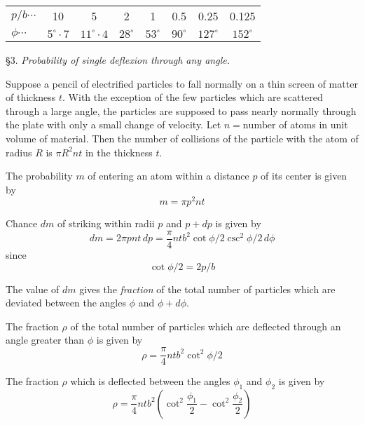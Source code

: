\documentclass{article}
\begin{document}
\begin{center}
\begin{tabular}{lccccccc}
$p/b\cdots$ & 10 & 5 & 2 & 1 & 0.5 & 0.25 & 0.125
\\
$\phi\cdots$ & $5^\circ\cdot7$ & $11^\circ\cdot4$ & $28^\circ$ & $53^\circ$ & $90^\circ$ & $127^\circ$ & $152^\circ$
\end{tabular}
\end{center}

\S 3. {\it Probability of single deflexion through any angle.}

\bigskip
Suppose a pencil of electrified particles to fall normally on a thin screen of matter of thickness $t$.
With the exception of the few particles which are scattered through a large angle,
the particles are supposed to pass nearly normally through the plate with only a small change of velocity.
Let $n=\text{number}$ of atoms in unit volume of material.
Then the number of collisions of the particle with the atom of radius $R$ is $\pi R^2nt$
in the thickness $t$.

\bigskip
The probability $m$ of entering an atom within a distance $p$ of its center is given by
\begin{equation*}
m=\pi p^2nt
\end{equation*}

Chance $dm$ of striking within radii $p$ and $p+dp$ is given by
\begin{equation*}
dm=2\pi pnt\,dp=\frac{\pi}{4}ntb^2\cot\phi/2\csc^2\phi/2\,d\phi
\tag{2}
\end{equation*}
since
\begin{equation*}
\cot\phi/2=2p/b
\end{equation*}

The value of $dm$ gives the {\it fraction} of the total number of particles
which are deviated between the angles $\phi$ and $\phi+d\phi$.

\bigskip
The fraction $\rho$ of the total number of particles which are deflected through an angle greater than $\phi$ is given by
\begin{equation*}
\rho=\frac{\pi}{4}ntb^2\cot^2\phi/2
\tag{3}
\end{equation*}

The fraction $\rho$ which is deflected between the angles $\phi_1$ and $\phi_2$ is given by
\begin{equation*}
\rho=\frac{\pi}{4}ntb^2
\left(\cot^2\frac{\phi_1}{2}-\cot^2\frac{\phi_2}{2}\right)
\tag{4}
\end{equation*}
\end{document}
